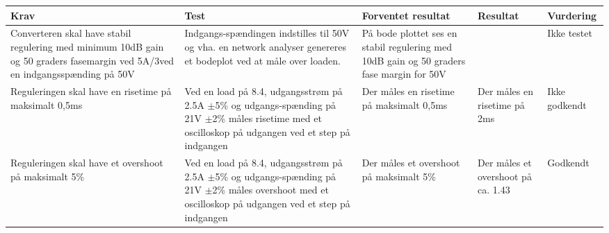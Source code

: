 \begin{tabularx}{\textwidth}{|X|X|X|X|X|}
	\hline
	\textbf{Krav} & \textbf{Test} & \textbf{Forventet resultat} & \textbf{Resultat} & \textbf{Vurdering} \\ \hline
	Converteren skal have stabil regulering med minimum 10dB gain og 50 graders fasemargin ved 5A/3\ohm ved en indgangsspænding på 50V & Indgangs-spændingen indstilles til 50V og vha. en network analyser genereres et bodeplot ved at måle over loaden.& På bode plottet ses en stabil regulering med 10dB gain og 50 graders fase margin for 50V && Ikke testet\\ \hline
	Reguleringen skal have en risetime på maksimalt 0,5ms & Ved en load på 8.4\ohm, udgangsstrøm på 2.5A $\pm$5\% og udgangs-spænding på 21V $\pm$2\% måles risetime med et oscilloskop på udgangen ved et step på indgangen & Der måles en risetime på maksimalt 0,5ms & Der måles en risetime på 2ms & Ikke godkendt \\ \hline
	Reguleringen skal have et overshoot på maksimalt 5\% & Ved en load på 8.4\ohm, udgangsstrøm på 2.5A $\pm$5\% og udgangs-spænding på 21V $\pm$2\% måles overshoot med et oscilloskop på udgangen ved et step på indgangen & Der måles et overshoot på maksimalt 5\% & Der måles et overshoot på ca. 1.43\percent & Godkendt \\ \hline
\end{tabularx}